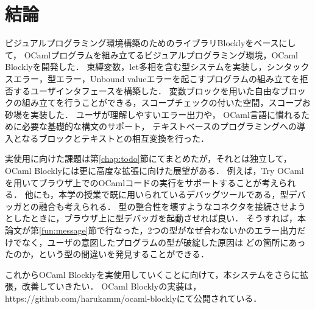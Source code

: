\chapter {結論}\label{chap:conclusion}

ビジュアルプログラミング環境構築のためのライブラリBlocklyをベースにして，
OCamlプログラムを組み立てるビジュアルプログラミング環境，OCaml Blocklyを開発した．
束縛変数，let多相を含む型システムを実装し，シンタックスエラー，型エラー，Unbound valueエラーを起こすプログラムの組み立てを拒否するユーザインタフェースを構築した．
変数ブロックを用いた自由なブロックの組み立てを行うことができる，スコープチェックの付いた空間，スコープお砂場を実装した．
ユーザが理解しやすいエラー出力や，
OCaml言語に慣れるために必要な基礎的な構文のサポート，
テキストベースのプログラミングへの導入となるブロックとテキストとの相互変換を行った．

実使用に向けた課題は第\ref{chap:todo}節にてまとめたが，それとは独立して，OCaml Blocklyには更に高度な拡張に向けた展望がある．
例えば，Try OCamlを用いてブラウザ上でのOCamlコードの実行をサポートすることが考えられる．
他にも，本学の授業で既に用いられているデバッグツールである，型デバッガ\cite{10.1007/978-3-642-41582-1_12}との融合も考えられる．
型の整合性を壊すようなコネクタを接続させようとしたときに，ブラウザ上に型デバッガを起動させれば良い．
そうすれば，本論文が第\ref{fun:message}節で行なった，2つの型がなぜ合わないかのエラー出力だけでなく，ユーザの意図したプログラムの型が破綻した原因は
どの箇所にあったのか，という型の間違いを発見することができる．

これからOCaml Blocklyを実使用していくことに向けて，本システムをさらに拡張，改善していきたい．
OCaml Blocklyの実装は，https://github.com/harukamm/ocaml-blocklyにて公開されている．

